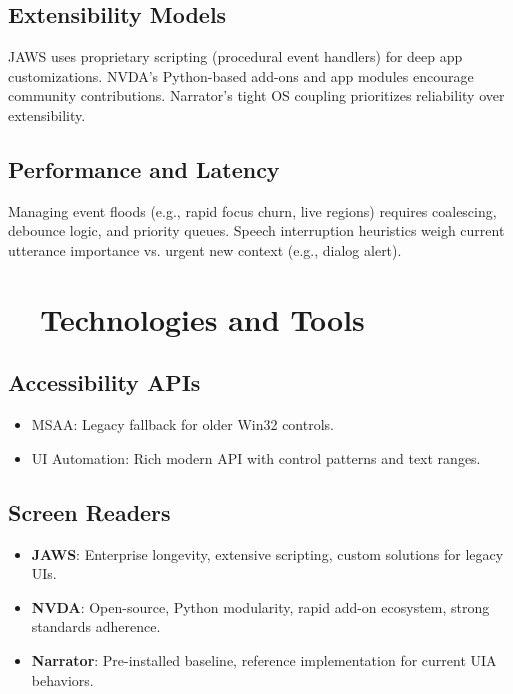 \subsection*{Extensibility Models}
JAWS uses proprietary scripting (procedural event handlers) for deep app customizations. NVDA’s Python-based add-ons and app modules encourage community contributions. Narrator’s tight OS coupling prioritizes reliability over extensibility.

\subsection*{Performance and Latency}
Managing event floods (e.g., rapid focus churn, live regions) requires coalescing, debounce logic, and priority queues. Speech interruption heuristics weigh current utterance importance vs. urgent new context (e.g., dialog alert).

\section{~~Technologies and Tools}
\label{sec:sr-technologies}
\subsection*{Accessibility APIs}
\begin{itemize}
	\item MSAA\supercite{MSAAWiki}: Legacy fallback for older Win32 controls.
	\item UI Automation\supercite{UIAutomationOverview}: Rich modern API with control patterns and text ranges.
\end{itemize}

\subsection*{Screen Readers}
\begin{itemize}
	\item \textbf{JAWS}\supercite{JAWSBasicCommands, JAWSScripting}: Enterprise longevity, extensive scripting, custom solutions for legacy UIs.
	\item \textbf{NVDA}\supercite{NVDAKeyboardCommands, NVAccess}: Open-source, Python modularity, rapid add-on ecosystem, strong standards adherence.
	\item \textbf{Narrator}\supercite{NarratorKeyboardCommands, NarratorTechDetails}: Pre-installed baseline, reference implementation for current UIA behaviors.
\end{itemize}

